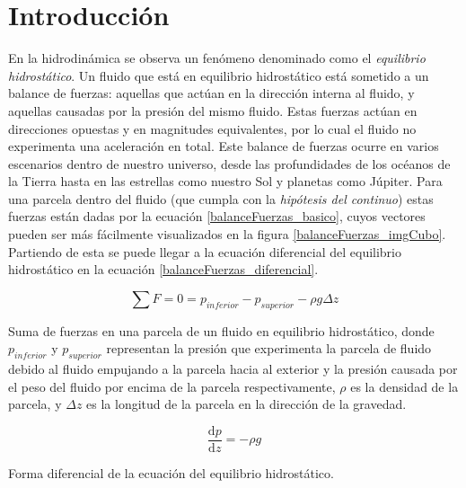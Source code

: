 \section{Introducción}

En la hidrodinámica se observa un fenómeno denominado como el \textit{equilibrio
hidrostático}. Un fluido que está en equilibrio hidrostático está sometido a un
balance de fuerzas: aquellas que actúan en la dirección interna al fluido, y
aquellas causadas por la presión del mismo fluido. Estas fuerzas actúan en
direcciones opuestas y en magnitudes equivalentes, por lo cual el fluido no
experimenta una aceleración en total. Este balance de fuerzas ocurre en varios
escenarios dentro de nuestro universo, desde las profundidades de los océanos de
la Tierra hasta en las estrellas como nuestro Sol y planetas como Júpiter. Para
una parcela dentro del fluido (que cumpla con la \textit{hipótesis del
continuo}) estas fuerzas están dadas por la ecuación
\ref{balanceFuerzas_basico}, cuyos vectores pueden ser más fácilmente
visualizados en la figura \ref{balanceFuerzas_imgCubo}. Partiendo de esta se
puede llegar a la ecuación diferencial del equilibrio hidrostático en la
ecuación \ref{balanceFuerzas_diferencial}.

\begin{equ}[!ht]
	\begin{equation} \label{balanceFuerzas_basico}
		\sum F = 0 = p_{inferior} - p_{superior} -\rho g \Delta z
	\end{equation}
	\caption{Suma de fuerzas en una parcela de un fluido en equilibrio
	hidrostático, donde \(p_{inferior}\) y \(p_{superior}\) representan la
	presión que experimenta la parcela de fluido debido al fluido empujando a la
	parcela hacia al exterior y la presión causada por el peso del fluido por
	encima de la parcela respectivamente, \(\rho\) es la densidad de la parcela,
	y \(\Delta z\) es la longitud de la parcela en la dirección de la gravedad.}
\end{equ}

\begin{equ}[!ht]
	\begin{equation} \label{balanceFuerzas_diferencial}
		\frac{\mathrm{d} p}{\mathrm{d} z} = - \rho g
	\end{equation}
	\caption{Forma diferencial de la ecuación del equilibrio hidrostático.}
\end{equ}


